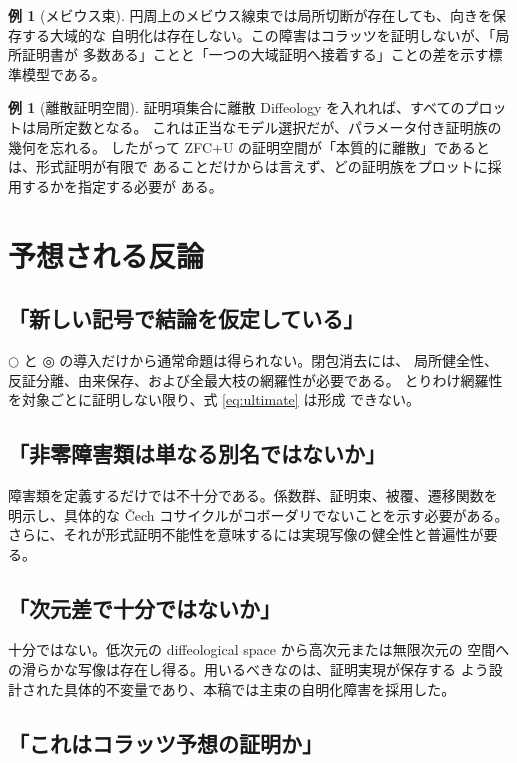 \documentclass[a4paper,11pt]{ltjsarticle}
\theoremstyle{definition}
\newtheorem{example}[definition]{例}
\theoremstyle{plain}
\newcommand{\dfix}{\mathord{\text{○}}}
\newcommand{\udfix}{\mathord{\text{◎}}}
\newcommand{\1}{\mathbf{1}}
\begin{document}
\begin{example}[メビウス束]
円周上のメビウス線束では局所切断が存在しても、向きを保存する大域的な
自明化は存在しない。この障害はコラッツを証明しないが、「局所証明書が
多数ある」ことと「一つの大域証明へ接着する」ことの差を示す標準模型である。
\end{example}

\begin{example}[離散証明空間]
証明項集合に離散 Diffeology を入れれば、すべてのプロットは局所定数となる。
これは正当なモデル選択だが、パラメータ付き証明族の幾何を忘れる。
したがって ZFC+U の証明空間が「本質的に離散」であるとは、形式証明が有限で
あることだけからは言えず、どの証明族をプロットに採用するかを指定する必要が
ある。
\end{example}

\section{予想される反論}

\subsection{「新しい記号で結論を仮定している」}

$\dfix$ と $\udfix$ の導入だけから通常命題は得られない。閉包消去には、
局所健全性、反証分離、由来保存、および全最大枝の網羅性が必要である。
とりわけ網羅性を対象ごとに証明しない限り、式 \eqref{eq:ultimate} は形成
できない。

\subsection{「非零障害類は単なる別名ではないか」}

障害類を定義するだけでは不十分である。係数群、証明束、被覆、遷移関数を
明示し、具体的な Čech コサイクルがコボーダリでないことを示す必要がある。
さらに、それが形式証明不能性を意味するには実現写像の健全性と普遍性が要る。

\subsection{「次元差で十分ではないか」}

十分ではない。低次元の diffeological space から高次元または無限次元の
空間への滑らかな写像は存在し得る。用いるべきなのは、証明実現が保存する
よう設計された具体的不変量であり、本稿では主束の自明化障害を採用した。

\subsection{「これはコラッツ予想の証明か」}
\end{document}
